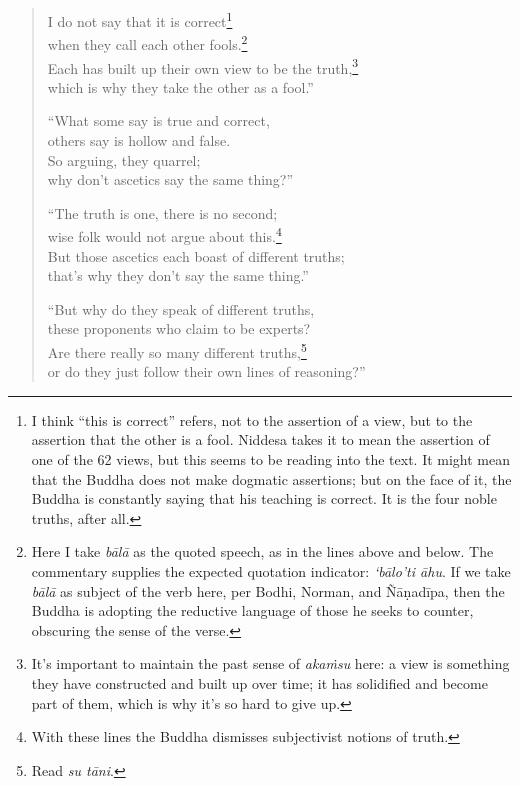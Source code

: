 \documentclass[12pt,openany]{book}%
\begin{document}
\begin{verse}
I do not say that it is correct\footnote{I think “this is correct” refers, not to the assertion of a view, but to the assertion that the other is a fool. Niddesa takes it to mean the assertion of one of the 62 views, but this seems to be reading into the text. It might mean that the Buddha does not make dogmatic assertions; but on the face of it, the Buddha is constantly saying that his teaching is correct. It is the four noble truths, after all. } \\
when they call each other fools.\footnote{Here I take \textit{\textsanskrit{bālā}} as the quoted speech, as in the lines above and below. The commentary supplies the expected quotation indicator: \textit{‘\textsanskrit{bālo}’ti \textsanskrit{āhu}}. If we take \textit{\textsanskrit{bālā}} as subject of the verb here, per Bodhi, Norman, and \textsanskrit{Ñāṇadīpa}, then the Buddha is adopting the reductive language of those he seeks to counter, obscuring the sense of the verse. } \\
Each has built up their own view to be the truth,\footnote{It’s important to maintain the past sense of \textit{\textsanskrit{akaṁsu}} here: a view is something they have constructed and built up over time; it has solidified and become part of them, which is why it’s so hard to give up. } \\
which is why they take the other as a fool.” 

“What some say is true and correct, \\
others say is hollow and false. \\
So arguing, they quarrel; \\
why don’t ascetics say the same thing?” 

“The truth is one, there is no second; \\
wise folk would not argue about this.\footnote{With these lines the Buddha dismisses subjectivist notions of truth. } \\
But those ascetics each boast of different truths; \\
that’s why they don’t say the same thing.” 

“But why do they speak of different truths, \\
these proponents who claim to be experts? \\
Are there really so many different truths,\footnote{Read \textit{su \textsanskrit{tāni}}. } \\
or do they just follow their own lines of reasoning?” 


\end{verse}
\end{document}
